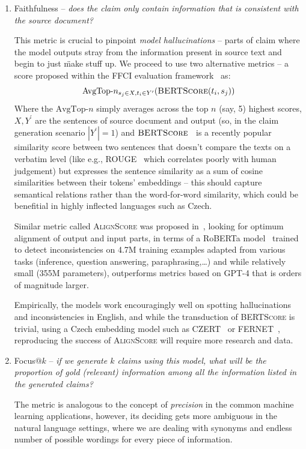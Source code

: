 \begin{enumerate}
    \item {\techbf Faithfulness} -- \textit{does the claim only contain information that is consistent with the source document?}
    
    This metric is crucial to pinpoint \textit{model hallucinations} -- parts of claim where the model outputs stray from the information present in source text and begin to just \"{make stuff up}. We proceed to use two alternative metrics -- a score proposed within the FFCI evaluation framework~\cite{ffci} as: 
    $$\text{AvgTop-}n_{s_j\in X, t_i\in Y^\prime}(\textsc{BERTScore}(t_i,s_j))$$
    Where the $\text{AvgTop-}n$ simply averages across the top $n$ (say, 5) highest scores, $X,Y^\prime$ are the sentences of source document and output (so, in the claim generation scenario $|Y^\prime|=1$) and $\textsc{BERTScore}$~\cite{bert-score} is a recently popular similarity score between two sentences that doesn't compare the texts on a verbatim level (like e.g., ROUGE~\cite{lin-2004-rouge} which correlates poorly with human judgement) but expresses the sentence similarity as a sum of cosine similarities between their tokens' embeddings -- this should capture semantical relations rather than the word-for-word similarity, which could be benefitial in highly inflected languages such as Czech.

    Similar metric called \textsc{AlignScore} was proposed in~\cite{zha2023alignscore}, looking for optimum alignment of output and input parts, in terms of a RoBERTa model~\cite{roberta} trained to detect inconsistencies on 4.7M training examples adapted from various tasks (inference, question answering, paraphrasing,\dots) and while relatively small (355M parameters), outperforms metrics based on GPT-4 that is orders of magnitude larger. 

    Empirically, the models work encouragingly well on spotting hallucinations and inconsistencies in English, and while the transduction of \textsc{BERTScore} is trivial, using a Czech embedding model such as CZERT~\cite{czert} or FERNET~\cite{fernet}, reproducing the success of \textsc{AlignScore} will require more research and data.

    \item {\techbf Focus}$@k$ -- \textit{if we generate $k$ claims using this model, what will be the proportion of gold (relevant) information among all the information listed in the generated claims?}
    
    The metric is analogous to the concept of \textit{precision} in the common machine learning applications, however, its deciding gets more ambiguous in the natural language settings, where we are dealing with synonyms and endless number of possible wordings for every piece of information.


\end{enumerate}
